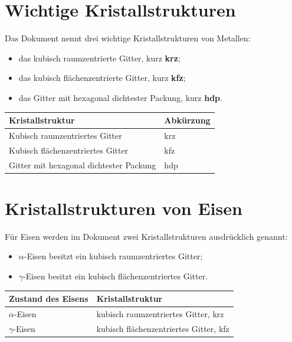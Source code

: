 \documentclass[
  12pt,
  a4paper,
  oneside
]{scrreprt}
\begin{document}
\section{Wichtige Kristallstrukturen}

Das Dokument nennt drei wichtige Kristallstrukturen von Metallen:

\begin{itemize}
  \item das kubisch raumzentrierte Gitter, kurz \textbf{krz};
  \item das kubisch flächenzentrierte Gitter, kurz \textbf{kfz};
  \item das Gitter mit hexagonal dichtester Packung, kurz
  \textbf{hdp}.
\end{itemize}



\begin{longtable}{
  >{\raggedright\arraybackslash}p{}
  >{\raggedright\arraybackslash}p{}
}
\toprule
\textbf{Kristallstruktur} &
\textbf{Abkürzung} \\
\midrule
\endhead

Kubisch raumzentriertes Gitter &
krz \\

Kubisch flächenzentriertes Gitter &
kfz \\

Gitter mit hexagonal dichtester Packung &
hdp \\

\bottomrule
\end{longtable}



\section{Kristallstrukturen von Eisen}

Für Eisen werden im Dokument zwei Kristallstrukturen ausdrücklich
genannt:

\begin{itemize}
  \item $\alpha$-Eisen besitzt ein kubisch raumzentriertes Gitter;
  \item $\gamma$-Eisen besitzt ein kubisch flächenzentriertes Gitter.
\end{itemize}



\begin{longtable}{
  >{\raggedright\arraybackslash}p{}
  >{\raggedright\arraybackslash}p{}
}
\toprule
\textbf{Zustand des Eisens} &
\textbf{Kristallstruktur} \\
\midrule
\endhead

$\alpha$-Eisen &
kubisch raumzentriertes Gitter, krz \\

$\gamma$-Eisen &
kubisch flächenzentriertes Gitter, kfz \\

\bottomrule
\end{longtable}
\end{document}
